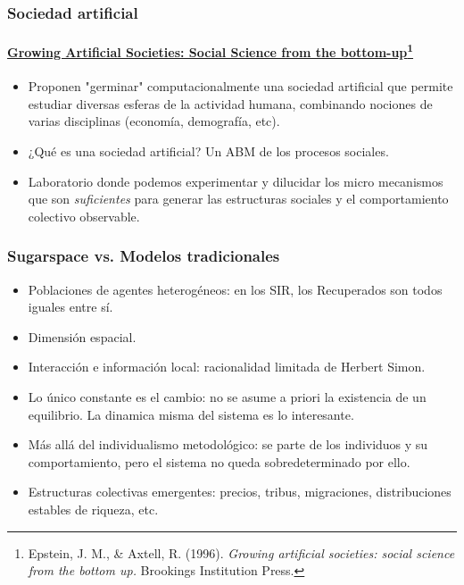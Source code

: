 \documentclass[11pt]{beamer}
\begin{document}
\begin{frame}
\frametitle{Sociedad artificial}
\framesubtitle{\href{https://wtf.tw/ref/epstein_axtell.pdf}{Growing Artificial Societies: Social Science from the bottom-up}\footnote{\scriptsize{Epstein, J. M., \& Axtell, R. (1996). \textit{Growing artificial societies: social science from the bottom up.} Brookings Institution Press.}}}
\begin{itemize}
	\item Proponen "germinar" computacionalmente una sociedad artificial que permite estudiar diversas esferas de la actividad humana, combinando nociones de varias disciplinas (economía, demografía, etc).
	\item ¿Qué es una sociedad artificial? Un ABM de los procesos sociales.
	\item Laboratorio donde podemos experimentar y dilucidar los micro mecanismos que son \textit{suficientes} para generar las estructuras sociales y el comportamiento colectivo observable.
\end{itemize}
\end{frame}

\begin{frame}
\frametitle{Sugarspace vs. Modelos tradicionales}
\begin{itemize}
	\item Poblaciones de agentes heterogéneos: en los SIR, los Recuperados son todos iguales entre sí.
	\item Dimensión espacial.
	\item Interacción e información local: racionalidad limitada de Herbert Simon.
	\item Lo único constante es el cambio: no se asume a priori la existencia de un equilibrio. La dinamica misma del sistema es lo interesante.
	\item Más allá del individualismo metodológico: se parte de los individuos y su comportamiento, pero el sistema no queda sobredeterminado por ello.
	\item Estructuras colectivas emergentes: precios, tribus, migraciones, distribuciones estables de riqueza, etc.
\end{itemize}
\end{frame}
\end{document}
